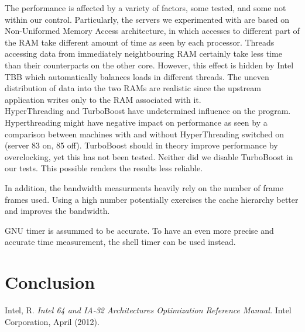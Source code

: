\documentclass[journal]{IEEEtran}
\begin{document}
The performance is affected by a variety of factors, some tested, and some not within our control. Particularly, the servers we experimented with are based on Non-Uniformed Memory Access architecture, in which accesses to different part of the RAM take different amount of time as seen by each processor. Threads accessing data from immediately neightbouring RAM certainly take less time than their counterparts on the other core. However, this effect is hidden by Intel TBB which automatically balances loads in different threads. The uneven distribution of data into the two RAMs are realistic since the upstream application writes only to the RAM associated with it. \\

HyperThreading and TurboBoost have undetermined influence on the program. Hyperthreading might have negative impact on performance as seen by a comparison between machines with and without HyperThreading switched on (server 83 on, 85 off). TurboBoost should in theory improve performance by overclocking, yet this has not been tested. Neither did we disable TurboBoost in our tests. This possible renders the results less reliable.

In addition, the bandwidth measurments heavily rely on the number of frame frames used. Using a high number potentially exercises the cache hierarchy better and improves the bandwidth. 

GNU timer is assummed to be accurate. To have an even more precise and accurate time measurement, the shell timer can be used instead. 

\section{Conclusion}	%


%
%
%

\begin{thebibliography}{1}

Intel, R. \emph{Intel 64 and IA-32 Architectures Optimization Reference Manual.} Intel Corporation, April (2012).



\end{thebibliography}
\end{document}
